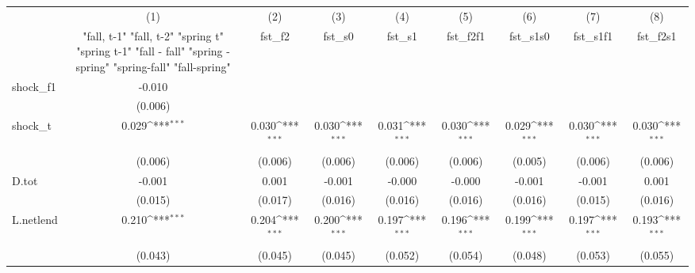 {
\def\sym#1{\ifmmode^{#1}\else\(^{#1}\)\fi}
\begin{tabular}{l*{8}{c}}
\toprule
            &\multicolumn{1}{c}{(1)}&\multicolumn{1}{c}{(2)}&\multicolumn{1}{c}{(3)}&\multicolumn{1}{c}{(4)}&\multicolumn{1}{c}{(5)}&\multicolumn{1}{c}{(6)}&\multicolumn{1}{c}{(7)}&\multicolumn{1}{c}{(8)}\\
            &\multicolumn{1}{c}{  "fall, t-1" "fall, t-2" "spring t" "spring t-1"  "fall - fall" "spring - spring" "spring-fall" "fall-spring" }&\multicolumn{1}{c}{fst\_f2}&\multicolumn{1}{c}{fst\_s0}&\multicolumn{1}{c}{fst\_s1}&\multicolumn{1}{c}{fst\_f2f1}&\multicolumn{1}{c}{fst\_s1s0}&\multicolumn{1}{c}{fst\_s1f1}&\multicolumn{1}{c}{fst\_f2s1}\\
\midrule
shock\_f1    &      -0.010         &                     &                     &                     &                     &                     &                     &                     \\
            &     (0.006)         &                     &                     &                     &                     &                     &                     &                     \\
\addlinespace
shock\_t     &       0.029\sym{***}&       0.030\sym{***}&       0.030\sym{***}&       0.031\sym{***}&       0.030\sym{***}&       0.029\sym{***}&       0.030\sym{***}&       0.030\sym{***}\\
            &     (0.006)         &     (0.006)         &     (0.006)         &     (0.006)         &     (0.006)         &     (0.005)         &     (0.006)         &     (0.006)         \\
\addlinespace
D.tot       &      -0.001         &       0.001         &      -0.001         &      -0.000         &      -0.000         &      -0.001         &      -0.001         &       0.001         \\
            &     (0.015)         &     (0.017)         &     (0.016)         &     (0.016)         &     (0.016)         &     (0.016)         &     (0.015)         &     (0.016)         \\
\addlinespace
L.netlend   &       0.210\sym{***}&       0.204\sym{***}&       0.200\sym{***}&       0.197\sym{***}&       0.196\sym{***}&       0.199\sym{***}&       0.197\sym{***}&       0.193\sym{***}\\
            &     (0.043)         &     (0.045)         &     (0.045)         &     (0.052)         &     (0.054)         &     (0.048)         &     (0.053)         &     (0.055)         \\

\end{tabular}}
